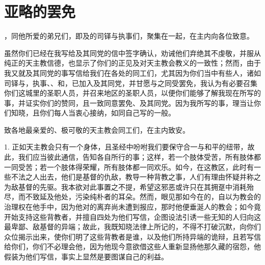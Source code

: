 
\chapter{亚略的罢免}


\par

，同他所爱的弟兄们，即及的司铎与执事们，聚集在一起，在主内向各位致意。\par

虽然你们已经在我写给及其同党的信中签字确认，劝诫他们弃绝其不虔敬，并服从纯正的天主教信德，也显示了你们的正见及对天主教会教义的一致性；然而，由于我又就及其同党的事写信给我们在各处的同工们，尤其因为你们当中有些人，诸如司铎与，执事、、和，已加入及其同党，并甘愿与之同受罢免，我认为有必要召集你们这城里的圣职人员，并召来地区的圣职人员，以便你们能够了解我现在所写的事，并证实你们的赞同，且一致同意罢免、及其同党。因为我所写的事，理当让你们知晓，且你们每人当衷心接纳，如同自己写的一般。\par

\par

致各地最亲爱的、极可敬的天主教会同工们，在主内致安。\par

1. 正如天主教会只有一个身体，且圣经中吩咐我们要保守合一与和平的纽带，故此，我们应当彼此通信，告知各自所行的事；这样，若一个肢体受苦，所有肢体都一同受苦；若一个肢体得荣耀，所有肢体都一同欢乐。如今，在这教区，此时有一些不法之人出去，他们是基督的仇敌，教导一种背教之事，人们有理由怀疑并称之为敌基督的先驱。我本欲对此事置之不提，希望这邪恶或许只在其拥趸中消耗殆尽，而不致延及他处，污染纯朴者的耳朵。然而，眼见那如今在的，自以为教会的治理权在他手中，因为他对的离弃尚未遭到报应，那时他便垂涎人的教会；如今竟开始支持这些背教者，并擅自四处为他们写信，企图设法引诱一些无知的人归向这最卑鄙、敌基督的异端；故此，我既知晓法律上所记的，不得不打破沉默，向你们众位揭示出来，使你们明了这些背教者是谁，以及他们所持异端的诡辩，且若写信给你们，你们不必理会他，因为他现今意欲借这些人重新显扬他那久藏的宿怨，他假装为他们写信，事实上显然是要图谋自己的利益。\par

